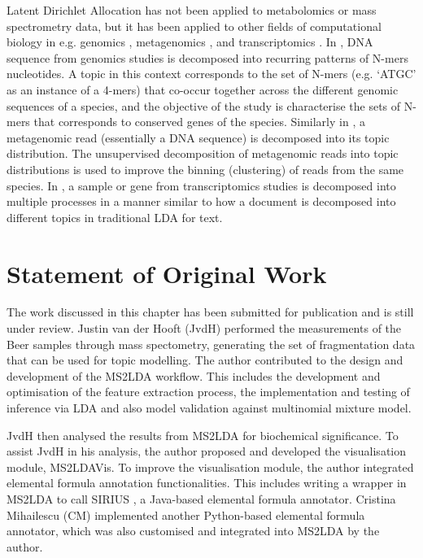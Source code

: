 Latent Dirichlet Allocation has not been applied to metabolomics or mass spectrometry data, but it has been applied to other fields of computational biology in e.g. genomics \cite{chen2010probabilistic}, metagenomics \cite{zhang2015exploiting}, and transcriptomics \cite{rogers2005latent}. In \cite{chen2010probabilistic}, DNA sequence from genomics studies is decomposed into recurring patterns of N-mers nucleotides. A topic in this context corresponds to the set of N-mers (e.g. `ATGC' as an instance of a 4-mers) that co-occur together across the different genomic sequences of a species, and the objective of the study is characterise the sets of N-mers that corresponds to conserved genes of the species. Similarly in \cite{zhang2015exploiting}, a metagenomic read (essentially a DNA sequence) is decomposed into its topic distribution. The unsupervised decomposition of metagenomic reads into topic distributions is used to improve the binning (clustering) of reads from the same species. In \cite{rogers2005latent}, a sample or gene from transcriptomics studies is decomposed into multiple processes in a manner similar to how a document is decomposed into different topics in traditional LDA for text.

\section{Statement of Original Work}

The work discussed in this chapter has been submitted for publication and is still under review. Justin van der Hooft (JvdH) performed the measurements of the Beer samples through mass spectometry, generating the set of fragmentation data that can be used for topic modelling. The author contributed to the design and development of the MS2LDA workflow. This includes the development and optimisation of the feature extraction process, the implementation and testing of inference via LDA and also model validation against multinomial mixture model. 

JvdH then analysed the results from MS2LDA for biochemical significance. To assist JvdH in his analysis, the author proposed and developed the visualisation module, MS2LDAVis. To improve the visualisation module, the author integrated elemental formula annotation functionalities. This includes writing a wrapper in MS2LDA to call SIRIUS \cite{Bocker2009}, a Java-based elemental formula annotator. Cristina Mihailescu (CM) implemented another Python-based elemental formula annotator, which was also customised and integrated into MS2LDA by the author. 

